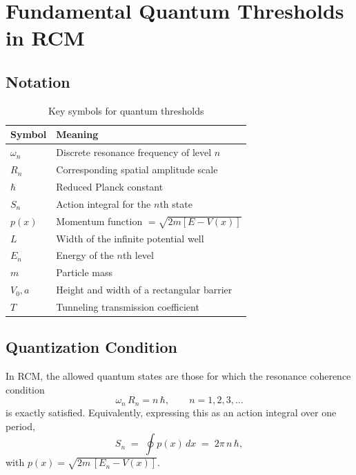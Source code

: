 \section{Fundamental Quantum Thresholds in RCM}

\subsection{Notation}
\begin{table}[ht]
  \centering
  \caption{Key symbols for quantum thresholds}
  \label{tab:quantum_notation}
  \begin{tabular}{@{}ll@{}}
    \toprule
    Symbol & Meaning \\
    \midrule
    $\omega_n$       & Discrete resonance frequency of level $n$ \\
    $R_n$            & Corresponding spatial amplitude scale \\
    $\hbar$          & Reduced Planck constant \\
    $S_n$            & Action integral for the $n$th state \\
    $p(x)$           & Momentum function $=\sqrt{2m[E - V(x)]}$ \\
    $L$              & Width of the infinite potential well \\
    $E_n$            & Energy of the $n$th level \\
    $m$              & Particle mass \\
    $V_0,a$          & Height and width of a rectangular barrier \\
    $T$              & Tunneling transmission coefficient \\
    \bottomrule
  \end{tabular}
\end{table}

\subsection{Quantization Condition}
In RCM, the allowed quantum states are those for which the resonance coherence condition
\begin{equation}\label{eq:quant_cond}
\omega_n\,R_n = n\,\hbar,\qquad n=1,2,3,\dots
\end{equation}
is exactly satisfied. Equivalently, expressing this as an action integral over one period,
\begin{equation}\label{eq:action_cond}
S_n \;=\;\oint p(x)\,dx \;=\; 2\pi\,n\,\hbar,
\end{equation}
with $p(x)=\sqrt{2m\,[E_n - V(x)]}$.

